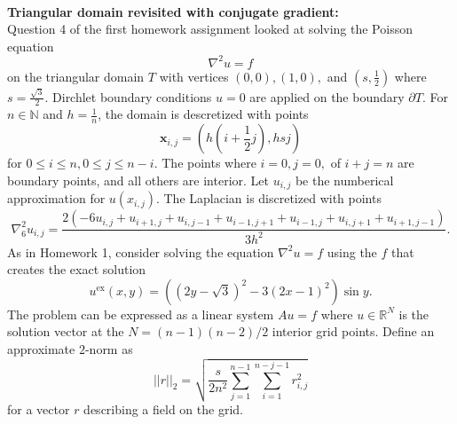 \documentclass{article}
\renewcommand{\vec}[1]{\mathbf{#1}}
\begin{document}
\begin{problem} \\
    \textbf{Triangular domain revisited with conjugate gradient:} \\
    Question 4 of the first homework assignment looked at solving the Poisson equation
   $$ \nabla^2u = f$$
   on the triangular domain $T$ with vertices $(0,0), (1,0),$ and $(s,\frac{1}{2})$ where $s = \frac{\sqrt{3}}{2}$. Dirchlet boundary conditions $u = 0$ are applied on the boundary $\partial T$. For $n \in \mathbb{N}$ and $h = \frac{1}{n}$, the domain is descretized with points 
   $$ \vec{x}_{i,j} = (h(i + \frac{1}{2}j), hsj) $$
   for $0 \leq i \leq n, 0 \leq j \leq n-i$. The points where $i = 0, j = 0,$ of $i + j = n$ are boundary points, and all others are interior. Let $u_{i,j}$ be the numberical approximation for $u(x_{i,j})$. The Laplacian is discretized with points
   $$ \nabla^2_6u_{i,j} = \frac{2(-6 u_{i,j} + u_{i+1,j} + u_{i,j-1} + u_{i-1,j+1} +u_{i-1,j} + u_{i,j+1} + u_{i+1,j-1})}{3h^2}. $$
   As in Homework 1, consider solving the equation $\nabla^2u = f$ using the $f$ that creates the exact solution
   $$ u^{\text{ex}}(x,y) = \left( (2y-\sqrt{3})^2- 3(2x-1)^2 \right) \sin y. $$
   The problem can be expressed as a linear system $Au = f$ where $u \in \mathbb{R}^N$ is the solution vector at the $N = (n-1)(n-2)/2$ interior grid points. Define an approximate $2$-norm as 
   $$ ||r||_2 = \sqrt{\frac{s}{2n^2} \sum_{j=1}^{n-1} \sum_{i=1}^{n-j-1} r_{i,j}^2} $$
   for a vector $r$ describing a field on the grid.


\end{problem}
\end{document}
